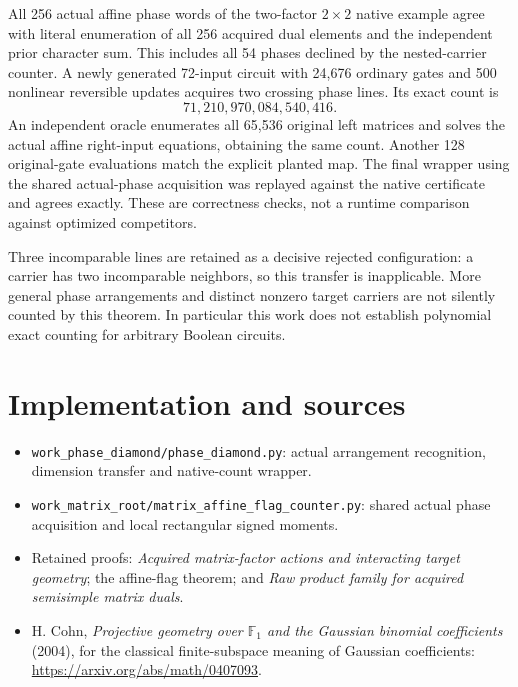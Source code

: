 \documentclass[11pt]{article}
\newcommand{\F}{\mathbb F}\newcommand{\rank}{\operatorname{rank}}
\begin{document}
All 256 actual affine phase words of the two-factor $2\times2$ native
example agree with literal enumeration of all 256 acquired dual elements
and the independent prior character sum. This includes all 54 phases
declined by the nested-carrier counter. A newly generated 72-input circuit
with 24,676 ordinary gates and 500 nonlinear reversible updates acquires
two crossing phase lines. Its exact count is
\[
 71{,}210{,}970{,}084{,}540{,}416.
\]
An independent oracle enumerates all 65,536 original left matrices and
solves the actual affine right-input equations, obtaining the same count.
Another 128 original-gate evaluations match the explicit planted map.
The final wrapper using the shared actual-phase acquisition was replayed
against the native certificate and agrees exactly. These are correctness
checks, not a runtime comparison against optimized competitors.

Three incomparable lines are retained
as a decisive rejected configuration: a carrier has two incomparable
neighbors, so this transfer is inapplicable. More general phase arrangements
and distinct nonzero target carriers are not silently counted by this
theorem. In particular this work does not establish polynomial exact
counting for arbitrary Boolean circuits.

\section*{Implementation and sources}
\begin{itemize}
\item \texttt{work\_phase\_diamond/phase\_diamond.py}: actual arrangement
recognition, dimension transfer and native-count wrapper.
\item \texttt{work\_matrix\_root/matrix\_affine\_flag\_counter.py}:
shared actual phase acquisition and local rectangular signed moments.
\item Retained proofs: \emph{Acquired matrix-factor actions and interacting
target geometry}; the affine-flag theorem; and
\emph{Raw product family for acquired semisimple matrix duals}.
\item H. Cohn, \emph{Projective geometry over $\F_1$ and the Gaussian
binomial coefficients} (2004), for the classical finite-subspace meaning
of Gaussian coefficients: \url{https://arxiv.org/abs/math/0407093}.
\end{itemize}
\end{document}
